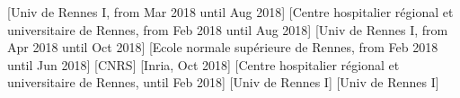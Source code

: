 \documentclass{ra2018}
\begin{document}
\begin{composition}
[Univ de Rennes I, from Mar 2018 until Aug 2018]
[Centre hospitalier régional et universitaire de Rennes, from Feb 2018 until Aug 2018]
[Univ de Rennes I, from Apr 2018 until Oct 2018]
[Ecole normale supérieure de Rennes, from Feb 2018 until Jun 2018]
[CNRS]
[Inria, Oct 2018]
[Centre hospitalier régional et universitaire de Rennes, until Feb 2018]
[Univ de Rennes I]
[Univ de Rennes I]
\end{composition}






%
\end{document}
